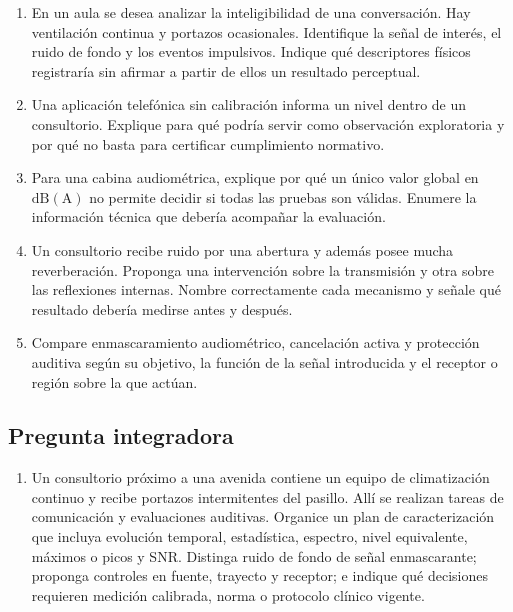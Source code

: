 \begin{enumerate}[label=\textbf{F\arabic*.},leftmargin=*]
    \item En un aula se desea analizar la inteligibilidad de una conversación.
    Hay ventilación continua y portazos ocasionales. Identifique la señal de
    interés, el ruido de fondo y los eventos impulsivos. Indique qué
    descriptores físicos registraría sin afirmar a partir de ellos un
    resultado perceptual.

    \item Una aplicación telefónica sin calibración informa un nivel dentro de
    un consultorio. Explique para qué podría servir como observación
    exploratoria y por qué no basta para certificar cumplimiento normativo.

    \item Para una cabina audiométrica, explique por qué un único valor global
    en \(\mathrm{dB(A)}\) no permite decidir si todas las pruebas son válidas.
    Enumere la información técnica que debería acompañar la evaluación.

    \item Un consultorio recibe ruido por una abertura y además posee mucha
    reverberación. Proponga una intervención sobre la transmisión y otra sobre
    las reflexiones internas. Nombre correctamente cada mecanismo y señale qué
    resultado debería medirse antes y después.

    \item Compare enmascaramiento audiométrico, cancelación activa y
    protección auditiva según su objetivo, la función de la señal introducida
    y el receptor o región sobre la que actúan.
\end{enumerate}

\subsection*{Pregunta integradora}

\begin{enumerate}[label=\textbf{I\arabic*.},leftmargin=*]
    \item Un consultorio próximo a una avenida contiene un equipo de
    climatización continuo y recibe portazos intermitentes del pasillo. Allí
    se realizan tareas de comunicación y evaluaciones auditivas. Organice un
    plan de caracterización que incluya evolución temporal, estadística,
    espectro, nivel equivalente, máximos o picos y SNR. Distinga ruido de
    fondo de señal enmascarante; proponga controles en fuente, trayecto y
    receptor; e indique qué decisiones requieren medición calibrada, norma o
    protocolo clínico vigente.
\end{enumerate}

